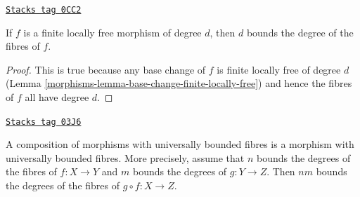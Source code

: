 \begin{lemma}
\label{morphisms-lemma-finite-locally-free-universally-bounded}
\href{https://stacks.math.columbia.edu/tag/0CC2}{\texttt{Stacks tag 0CC2}}

If $f$ is a finite locally free morphism of degree $d$, then
$d$ bounds the degree of the fibres of $f$.
\end{lemma}

\begin{proof}

This is true because any base change of $f$ is
finite locally free of degree $d$
(Lemma \ref{morphisms-lemma-base-change-finite-locally-free})
and hence the fibres of $f$ all have degree $d$.
\end{proof}

\begin{lemma}
\label{morphisms-lemma-composition-universally-bounded}
\href{https://stacks.math.columbia.edu/tag/03J6}{\texttt{Stacks tag 03J6}}

A composition of morphisms with universally bounded fibres
is a morphism with universally bounded fibres. More precisely,
assume that $n$ bounds the degrees of the fibres of $f : X \to Y$ and
$m$ bounds the degrees of $g : Y \to Z$.
Then $nm$ bounds the degrees of the fibres of $g \circ f : X \to Z$.
\end{lemma}

